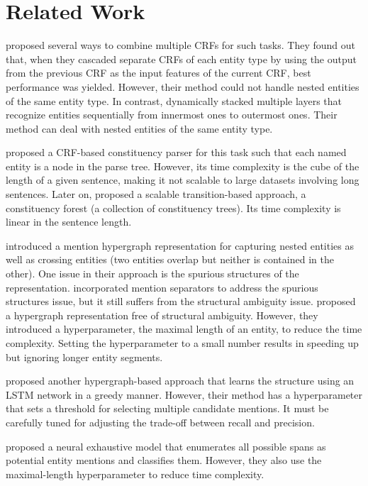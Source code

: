 \documentclass[11pt,a4paper]{article}
\begin{document}
\section{Related Work}

\citet{alex-etal-2007-recognising} proposed several ways to combine multiple CRFs for such tasks.
They found out that, when they cascaded separate CRFs of each entity type by using the output from the previous CRF as the input features of the current CRF, best performance was yielded.
However, their method could not handle nested entities of the same entity type.
In contrast, \citet{ju-etal-2018-neural} dynamically stacked multiple layers that recognize entities sequentially from innermost ones to outermost ones.
Their method can deal with nested entities of the same entity type.

\citet{finkel-manning-2009-nested} proposed a CRF-based constituency parser for this task such that
each named entity is a node in the parse tree.
However, its time complexity is the cube of the length of a given sentence, making it not scalable to large datasets involving long sentences.
Later on, \citet{wang-etal-2018-neural-transition} proposed a scalable transition-based approach, a constituency forest (a collection of constituency trees).
Its time complexity is linear in the sentence length.

\citet{lu-roth-2015-joint} introduced a mention hypergraph representation for capturing nested entities as well as crossing entities (two entities overlap but neither is contained in the other).
One issue in their approach is the spurious structures of the representation.
\citet{muis-lu-2017-labeling} incorporated mention separators to address the spurious structures issue, but it still suffers from the structural ambiguity issue.
\citet{wang-lu-2018-neural} proposed a hypergraph representation free of structural ambiguity.
However, they introduced a hyperparameter, the maximal length of an entity, to reduce the time complexity.
Setting the hyperparameter to a small number results in speeding up but ignoring longer entity segments.

\citet{katiyar-cardie-2018-nested} proposed another hypergraph-based approach that learns the structure using an LSTM network in a greedy manner.
However, their method has a hyperparameter that sets a threshold for selecting multiple candidate mentions.
It must be carefully tuned for adjusting the trade-off between recall and precision.

\citet{sohrab-miwa-2018-deep} proposed a neural exhaustive model that enumerates all possible spans as potential entity mentions and classifies them.
However, they also use the maximal-length hyperparameter to reduce time complexity.
\end{document}
